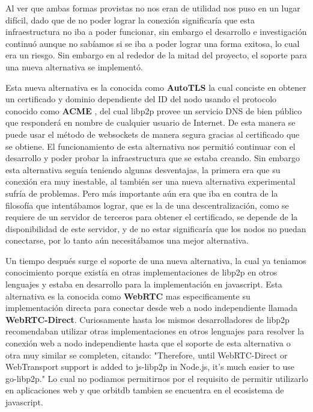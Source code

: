 Al ver que ambas formas provistas no nos eran de utilidad nos puso en un lugar difícil, dado que de no poder lograr la conexión significaría que esta infraestructura no iba a poder funcionar, sin embargo el desarrollo e investigación continuó aunque no sabíamos si se iba a poder lograr una forma exitosa, lo cual era un riesgo. Sin embargo en al rededor de la mitad del proyecto, el soporte para una nueva alternativa se implementó.

Esta nueva alternativa es la conocida como \textbf{AutoTLS} \cite{autotls} la cual conciste en obtener un certificado y dominio dependiente del ID del nodo usando el protocolo conocido como \textbf{ACME} \cite{acme}, del cual libp2p provee un servicio DNS de bien público que responderá en nombre de cualquier usuario de Internet. De esta manera se puede usar el método de websockets de manera segura gracias al certificado que se obtiene. El funcionamiento de esta alternativa nos permitió continuar con el desarrollo y poder probar la infraestructura que se estaba creando. Sin embargo esta alternativa seguía teniendo algunas desventajas, la primera era que su conexión era muy inestable, al también ser una nueva alternativa experimental sufría de problemas. Pero más importante aún era que iba en contra de la filosofía que intentábamos lograr, que es la de una descentralización, como se requiere de un servidor de terceros para obtener el certificado, se depende de la disponibilidad de este servidor, y de no estar significaría que los nodos no puedan conectarse, por lo tanto aún necesitábamos una mejor alternativa.

Un tiempo después surge el soporte de una nueva alternativa, la cual ya teniamos conocimiento porque existía en otras implementaciones de libp2p en otros lenguajes y estaba en desarrollo para la implementación en javascript. Esta alternativa es la conocida como \textbf{WebRTC} \cite{webrtc} mas especificamente su implementación directa para conectar desde web a nodo independiente llamada \textbf{WebRTC-Direct}.  Curiosamente hasta los mismos desarrolladores de libp2p recomendaban utilizar otras implementaciones en otros lenguajes para resolver la conexión web a nodo independiente hasta que el soporte de esta alternativa o otra muy similar se completen, citando: "Therefore, until WebRTC-Direct or WebTransport support is added to js-libp2p in Node.js, it’s much easier to use go-libp2p." \cite{differences-nodejs-browser} Lo cual no podiamos permitirnos por el requisito de permitir utilizarlo en aplicaciones web y que orbitdb tambien se encuentra en el ecosistema de javascript.

